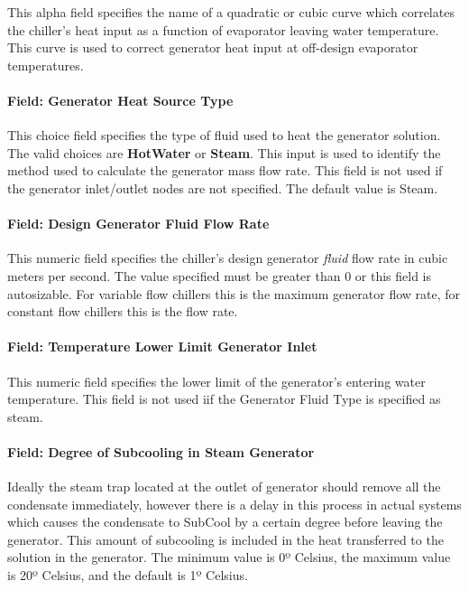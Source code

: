 This alpha field specifies the name of a quadratic or cubic curve which correlates the chiller's heat input as a function of evaporator leaving water temperature. This curve is used to correct generator heat input at off-design evaporator temperatures.

\paragraph{Field: Generator Heat Source Type}\label{field-generator-heat-source-type}

This choice field specifies the type of fluid used to heat the generator solution. The valid choices are \textbf{HotWater} or \textbf{Steam}. This input is used to identify the method used to calculate the generator mass flow rate. This field is not used if the generator inlet/outlet nodes are not specified. The default value is Steam.

\paragraph{Field: Design Generator Fluid Flow Rate}\label{field-design-generator-fluid-flow-rate-1}

This numeric field specifies the chiller's design generator \emph{fluid} flow rate in cubic meters per second. The value specified must be greater than 0 or this field is autosizable. For variable flow chillers this is the maximum generator flow rate, for constant flow chillers this is the flow rate.

\paragraph{Field: Temperature Lower Limit Generator Inlet}\label{field-temperature-lower-limit-generator-inlet}

This numeric field specifies the lower limit of the generator's entering water temperature. This field is not used iif the Generator Fluid Type is specified as steam.

\paragraph{Field: Degree of Subcooling in Steam Generator}\label{field-degree-of-subcooling-in-steam-generator-1}

Ideally the steam trap located at the outlet of generator should remove all the condensate immediately, however there is a delay in this process in actual systems which causes the condensate to SubCool by a certain degree before leaving the generator. This amount of subcooling is included in the heat transferred to the solution in the generator. The minimum value is 0º Celsius, the maximum value is 20º Celsius, and the default is 1º Celsius.

